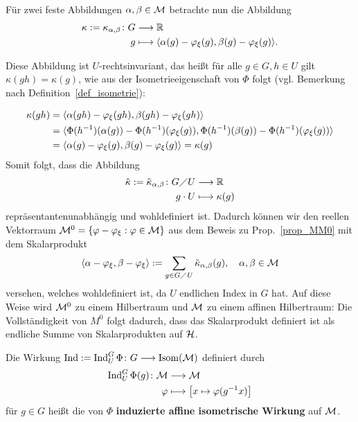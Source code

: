 Für zwei feste Abbildungen $\alpha, \beta \in \MM$ betrachte nun die Abbildung
\begin{equation}
\begin{aligned}
\kappa := \kappa_{\alpha,\beta} \colon G &\longrightarrow \RR \\
g &\longmapsto \sprod{\alpha(g) - \varphi_\xi(g),\beta(g) - \varphi_\xi(g)}.
\end{aligned}
\end{equation}

Diese Abbildung ist $U$-rechtsinvariant, das heißt für alle $g \in G, h \in U$ gilt $\kappa(gh) = \kappa(g)$, wie aus der Isometrieeigenschaft von $\Phi$ folgt (vgl. Bemerkung nach Definition~\ref{def_isometrie}):

\begin{equation}
\begin{aligned}
	\kappa(gh) &= \sprod{\alpha(gh) - \varphi_\xi(gh),\beta(gh) - \varphi_\xi(gh)} \\
		&= \sprod{\Phi(h^{-1})(\alpha(g)) - \Phi(h^{-1})(\varphi_\xi(g)), \Phi(h^{-1})(\beta(g)) - \Phi(h^{-1})(\varphi_\xi(g))} \\
		&= \sprod{\alpha(g) - \varphi_\xi(g), \beta(g) - \varphi_\xi(g)} = \kappa(g)
\end{aligned}
\end{equation}
\newpage
Somit folgt, dass die Abbildung
\begin{equation}
\begin{aligned}
	\tilde{\kappa} := \tilde{\kappa}_{\alpha,\beta} \colon G \diagup U &\longrightarrow \RR \\
			g \cdot U &\longmapsto \kappa(g)
\end{aligned}
\end{equation}
repräsentantenunabhängig und wohldefiniert ist. Dadurch können wir den reellen Vektorraum $\MM^0 = \{\varphi - \varphi_\xi : \varphi \in \MM\}$ aus dem Beweis zu Prop.~\ref{prop_MM0} mit dem Skalarprodukt
\[
	\sprod{\alpha - \varphi_\xi, \beta-\varphi_\xi} := \sum\limits_{g \in G \diagup U} \tilde{\kappa}_{\alpha,\beta} (g), \quad \alpha,\beta \in \MM
\]
versehen, welches wohldefiniert ist, da $U$ endlichen Index in $G$ hat. Auf diese Weise wird $\MM^0$ zu einem Hilbertraum und $\MM$ zu einem affinen Hilbertraum: Die Vollständigkeit von $M^0$ folgt dadurch, dass das Skalarprodukt definiert ist als endliche Summe von Skalarprodukten auf $\HH$.

\begin{definition}
	Die Wirkung $\Ind := \Ind_U^G\Phi \colon G \longrightarrow \Isom(\MM)$
	definiert durch
	\begin{equation}
	\begin{aligned}
		\Ind_U^G\Phi(g)\colon \MM &\longrightarrow \MM \\
		\varphi &\longmapsto \benbrace*{x \mapsto \varphi(g^{-1}x)}
	\end{aligned}
	\end{equation}
	für $g \in G$ heißt die von $\Phi$ \textbf{induzierte affine isometrische Wirkung} auf $\MM$.
\end{definition}

